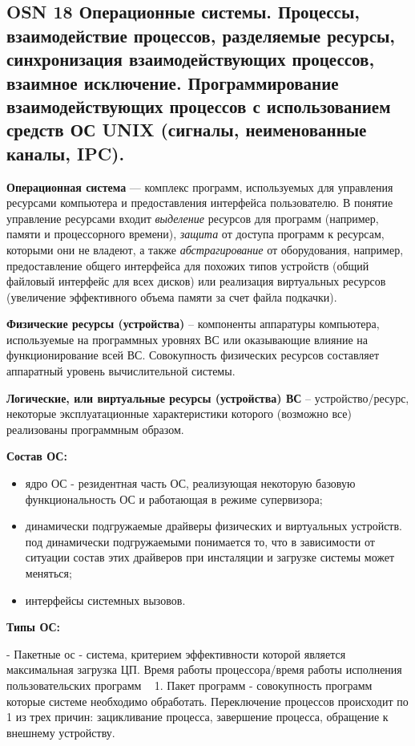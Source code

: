 \subsection{OSN 18 Операционные системы. Процессы, взаимодействие процессов, разделяемые ресурсы, синхронизация взаимодействующих процессов, взаимное исключение. Программирование взаимодействующих процессов с использованием средств ОС UNIX (сигналы, неименованные каналы, IPC).}

\textbf{Операционная система} --- комплекс программ, используемых для управления ресурсами компьютера и предоставления интерфейса пользователю.
В понятие управление ресурсами входит \textit{выделение} ресурсов для программ (например, памяти и процессорного времени),
\textit{защита} от доступа программ к ресурсам, которыми они не владеют, а также
\textit{абстрагирование} от оборудования, например, предоставление общего интерфейса для похожих типов устройств
(общий файловый интерфейс для всех дисков) или реализация виртуальных ресурсов (увеличение эффективного объема памяти за счет файла подкачки).

\textbf{Физические ресурсы (устройства)} -- компоненты аппаратуры компьютера, используемые на программных уровнях ВС или оказывающие влияние на функционирование всей ВС. Совокупность физических ресурсов составляет аппаратный уровень вычислительной системы.

\textbf{Логические, или виртуальные ресурсы (устройства) ВС} -- устройство/ресурс, некоторые эксплуатационные характеристики которого (возможно все) реализованы программным образом.

\textbf{Состав ОС:} 
\begin{itemize}
    \item ядро ОС - резидентная часть ОС, реализующая некоторую базовую функциональность ОС и работающая в режиме супервизора;
    \item динамически подгружаемые драйверы физических и виртуальных устройств. под динамически подгружаемыми понимается то, что в зависимости от ситуации состав этих драйверов при инсталяции и загрузке системы может меняться;
    \item интерфейсы системных вызовов.
\end{itemize} 

\textbf{Типы ОС:} 

- Пакетные ос  - система, критерием эффективности которой является максимальная загрузка ЦП. Время работы процессора/время работы исполнения пользовательских программ ~ 1. Пакет программ - совокупность программ которые системе необходимо обработать. Переключение процессов происходит по 1 из трех причин: зацикливание процесса, завершение процесса, обращение к внешнему устройству. 

